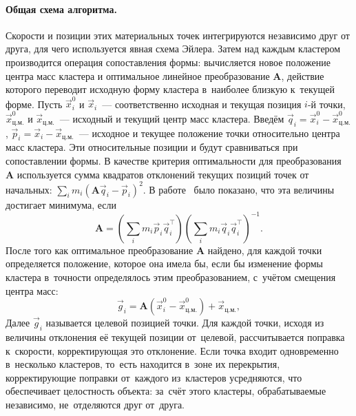 \documentclass[a4paper, 14pt, titlepage]{extarticle}
\newcommand{\vect}[1]{\vec{#1}} %
\newcommand{\matx}[1]{\mathbf{#1}} %
\newcommand{\transposed}{\top} %
\begin{document}
        \paragraph{Общая схема алгоритма.} Скорости и позиции этих материальных точек интегрируются независимо
        друг от друга, для чего используется явная схема Эйлера. Затем над каждым кластером
        производится операция сопоставления формы: вычисляется новое положение центра масс кластера
        и оптимальное линейное преобразование $\matx A$, действие которого переводит исходную форму
        кластера в~наиболее близкую к~текущей форме. Пусть $\vect{x}^0_i$ и $\vect{x}_i$~---
        соответственно исходная и текущая позиция $i$-й точки,
        $\vect{x}^0_{ц.м.}$ и $\vect{x}_{ц.м.}$~--- исходный и текущий центр масс кластера. Введём
        $\vect{q}_i = \vect{x}^0_i - \vect{x}^0_{ц.м.}$,
        $\vect{p}_i = \vect{x}_i - \vect{x}_{ц.м.}$~--- исходное и текущее положение точки
        относительно центра масс кластера. Эти относительные позиции и будут сравниваться при
        сопоставлении формы. В качестве критерия оптимальности для преобразования $\matx A$
        используется сумма квадратов отклонений текущих позиций точек от начальных:
        $\sum_i m_i (\matx A \vect{q}_i - \vect{p}_i )^2$. В работе~\cite{mueller-meshless} было
        показано, что эта величины достигает минимума, если
        \begin{equation}
          \matx A = \left( \sum_i m_i \vect{p}_i \vect{q}_i^\transposed \right)
                    \left( \sum_i m_i \vect{q}_i \vect{q}_i^\transposed \right)^{-1}.
        \end{equation}
        После того как оптимальное преобразование $\matx A$ найдено, для каждой точки определяется
        положение, которое она имела бы, если бы изменение формы кластера в~точности определялось этим
        преобразованием, с~учётом смещения центра масс:
        \begin{equation}
          \vect{g}_i = \matx{A} (\vect{x}^0_i - \vect{x}^0_{ц.м.}) + \vect{x}_{ц.м.},
        \end{equation}
        Далее $\vect{g}_i$ называется целевой позицией точки. Для каждой точки, исходя из величины
        отклонения её текущей позиции от~целевой, рассчитывается поправка к~скорости, корректирующая
        это отклонение. Если точка входит одновременно в~несколько кластеров, то~есть находится
        в~зоне их перекрытия, корректирующие поправки от~каждого из~кластеров усредняются, что
        обеспечивает целостность объекта: за~счёт этого кластеры, обрабатываемые независимо,
        не~отделяются друг от~друга.
\end{document}
